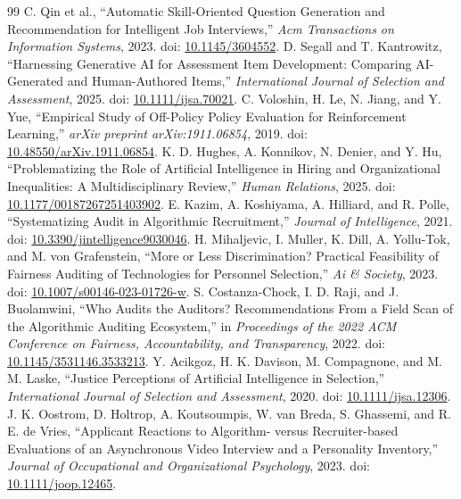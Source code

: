 \documentclass[journal]{IEEEtran}
\begin{document}
\begin{thebibliography}{99}
 C. Qin et al., ``Automatic Skill-Oriented Question Generation and Recommendation for Intelligent Job Interviews,'' \emph{Acm Transactions on Information Systems}, 2023. doi: \href{https://doi.org/10.1145/3604552}{10.1145/3604552}.
 D. Segall and T. Kantrowitz, ``Harnessing Generative AI for Assessment Item Development: Comparing AI-Generated and Human-Authored Items,'' \emph{International Journal of Selection and Assessment}, 2025. doi: \href{https://doi.org/10.1111/ijsa.70021}{10.1111/ijsa.70021}.
 C. Voloshin, H. Le, N. Jiang, and Y. Yue, ``Empirical Study of Off-Policy Policy Evaluation for Reinforcement Learning,'' \emph{arXiv preprint arXiv:1911.06854}, 2019. doi: \href{https://doi.org/10.48550/arXiv.1911.06854}{10.48550/arXiv.1911.06854}.
 K. D. Hughes, A. Konnikov, N. Denier, and Y. Hu, ``Problematizing the Role of Artificial Intelligence in Hiring and Organizational Inequalities: A Multidisciplinary Review,'' \emph{Human Relations}, 2025. doi: \href{https://doi.org/10.1177/00187267251403902}{10.1177/00187267251403902}.
 E. Kazim, A. Koshiyama, A. Hilliard, and R. Polle, ``Systematizing Audit in Algorithmic Recruitment,'' \emph{Journal of Intelligence}, 2021. doi: \href{https://doi.org/10.3390/jintelligence9030046}{10.3390/jintelligence9030046}.
 H. Mihaljevic, I. Muller, K. Dill, A. Yollu-Tok, and M. von Grafenstein, ``More or Less Discrimination? Practical Feasibility of Fairness Auditing of Technologies for Personnel Selection,'' \emph{Ai \& Society}, 2023. doi: \href{https://doi.org/10.1007/s00146-023-01726-w}{10.1007/s00146-023-01726-w}.
 S. Costanza-Chock, I. D. Raji, and J. Buolamwini, ``Who Audits the Auditors? Recommendations From a Field Scan of the Algorithmic Auditing Ecosystem,'' in \emph{Proceedings of the 2022 ACM Conference on Fairness, Accountability, and Transparency}, 2022. doi: \href{https://doi.org/10.1145/3531146.3533213}{10.1145/3531146.3533213}.
 Y. Acikgoz, H. K. Davison, M. Compagnone, and M. M. Laske, ``Justice Perceptions of Artificial Intelligence in Selection,'' \emph{International Journal of Selection and Assessment}, 2020. doi: \href{https://doi.org/10.1111/ijsa.12306}{10.1111/ijsa.12306}.
 J. K. Oostrom, D. Holtrop, A. Koutsoumpis, W. van Breda, S. Ghassemi, and R. E. de Vries, ``Applicant Reactions to Algorithm- versus Recruiter-based Evaluations of an Asynchronous Video Interview and a Personality Inventory,'' \emph{Journal of Occupational and Organizational Psychology}, 2023. doi: \href{https://doi.org/10.1111/joop.12465}{10.1111/joop.12465}.

\end{thebibliography}
\end{document}
